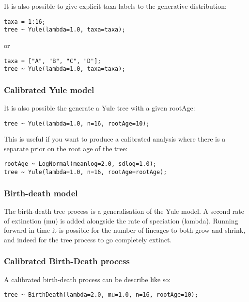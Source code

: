 \documentclass[oneside]{article}
\begin{document}
It is also possible to give explicit taxa labels to the generative distribution:

\begin{verbatim}
taxa = 1:16;
tree ~ Yule(lambda=1.0, taxa=taxa);
\end{verbatim}

or

\begin{verbatim}
taxa = ["A", "B", "C", "D"];
tree ~ Yule(lambda=1.0, taxa=taxa);
\end{verbatim}

\subsubsection{Calibrated Yule model}

It is also possible the generate a Yule tree with a given rootAge:

\begin{verbatim}
tree ~ Yule(lambda=1.0, n=16, rootAge=10);
\end{verbatim}

This is useful if you want to produce a calibrated analysis where there is a separate prior on the root age of the tree:

\begin{verbatim}
rootAge ~ LogNormal(meanlog=2.0, sdlog=1.0);
tree ~ Yule(lambda=1.0, n=16, rootAge=rootAge);
\end{verbatim}

\subsubsection{Birth-death model}

The birth-death tree process is a generalisation of the Yule model. A second rate of extinction (mu) is added alongside
the rate of speciation (lambda). Running forward in time it is possible for the number of lineages to both grow and
shrink, and indeed for the tree process to go completely extinct.

\subsubsection{Calibrated Birth-Death process}

A calibrated birth-death process can be describe like so:

\begin{verbatim}
tree ~ BirthDeath(lambda=2.0, mu=1.0, n=16, rootAge=10);
\end{verbatim}
\end{document}
